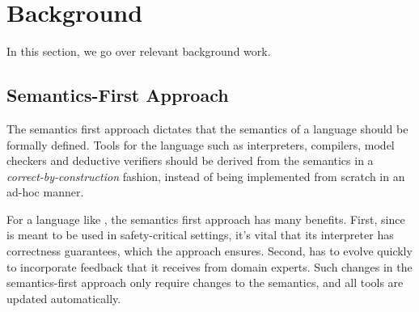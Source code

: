 \section{Background}
In this section, we go over relevant background work.

\subsection{Semantics-First Approach}

The semantics first approach dictates that the semantics
of a language should be formally defined. Tools for the language
such as interpreters, compilers, model checkers and deductive
verifiers should be derived from the semantics in a
\emph{correct-by-construction} fashion, instead of being implemented
from scratch in an ad-hoc manner.

For a language like \MediK{}, the semantics first approach has many benefits. First,
since \MediK{} is meant to be used in safety-critical settings,
it's vital that its interpreter has correctness guarantees, which
the approach ensures. Second, \MediK{} has to evolve quickly
to incorporate feedback that it receives from domain experts.
Such changes in the semantics-first approach only require changes to
the semantics, and all tools are updated automatically.
